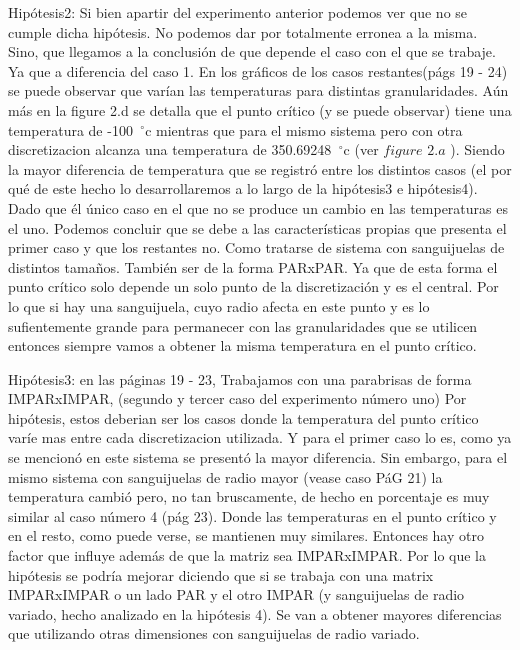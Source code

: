 Hipótesis2: Si bien apartir del experimento anterior podemos ver que no se cumple dicha hipótesis. No podemos dar por totalmente erronea a la misma. Sino, que llegamos a la conclusión de que depende el caso con el que se trabaje. Ya que a diferencia del caso 1. En los gráficos de los casos restantes(págs 19 - 24) se puede observar que varían las temperaturas para distintas granularidades. Aún más en la figure 2.d se detalla que el punto crítico (y se puede observar) tiene una temperatura de -100\hspace{-1.5mm}$\phantom{a}^{\circ}$c mientras que para el mismo sistema pero con otra discretizacion alcanza una temperatura de  350.69248\hspace{-1.5mm}$\phantom{a}^{\circ}$c (ver $figure$ $2.a$ ). Siendo la mayor diferencia de temperatura que se registró entre los distintos casos (el por qué de este hecho lo desarrollaremos a lo largo de la hipótesis3 e hipótesis4). Dado que él único caso en el que no se produce un cambio en las temperaturas es el uno. Podemos concluir que se debe a las características propias que presenta el primer caso y que los restantes no. Como tratarse de sistema con sanguijuelas de distintos tamaños. También ser de la forma PARxPAR. Ya que de esta forma el punto crítico solo depende un solo punto de la discretización y es el central. Por lo que si hay una sanguijuela, cuyo radio afecta en este punto y es lo sufientemente grande para permanecer con las granularidades que se utilicen entonces siempre vamos a obtener la misma temperatura en el punto crítico. \newline \newline


Hipótesis3: en las páginas 19 - 23, Trabajamos con una parabrisas de forma IMPARxIMPAR, (segundo y tercer caso del experimento número uno) Por hipótesis, estos deberian ser los casos donde la temperatura del punto crítico varíe mas entre cada discretizacion utilizada. Y para el primer caso lo es, como ya se mencionó en este sistema se presentó la mayor diferencia. Sin embargo, para el mismo sistema con sanguijuelas de radio mayor (vease caso PáG 21) la temperatura cambió pero, no tan bruscamente, de hecho en porcentaje es muy similar al caso número 4 (pág 23). Donde las temperaturas en el punto crítico y en el resto, como puede verse, se mantienen muy similares. Entonces hay otro factor que influye además de que la matriz sea IMPARxIMPAR. Por lo que la hipótesis se podría mejorar diciendo que si se trabaja con una matrix IMPARxIMPAR o un lado PAR y el otro IMPAR (y sanguijuelas de radio variado, hecho analizado en la hipótesis 4). Se van a obtener mayores diferencias que utilizando otras dimensiones con sanguijuelas de radio variado.\newline \newline


